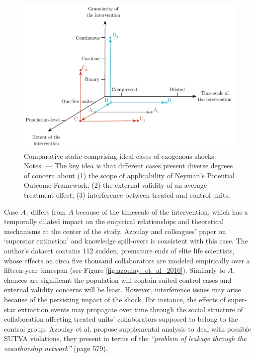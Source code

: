 \begin{refsection}
\begin{figure}[!htbp]
    \begin{center}
      \includegraphics[width=1\textwidth]{exhibits/comparative_static.pdf}
    \end{center}
    \caption{Comparative static comprising ideal cases of exogenous shocks. 
    Notes. --- The key idea is that different cases present diverse 
    degrees of concern about (1) the scope of applicability of Neyman's
    Potential Outcome Framework; (2) the external validity of an average
    treatment effect; (3) interference between treated and control
    units.}
    \label{fig:comparative_static}
\end{figure}

Case $A_{1}$ differs from $A$ because of the timescale of the intervention,
which has a temporally dilated impact on the empirical relationships and 
theoretical mechanisms at the center of the study. Azoulay and colleagues'
\autocite*{azoulay_et_al_2010} paper on `superstar extinction' and knowledge
spill-overs is consistent with this case. The author's dataset contains 112
sudden, premature ends of elite life scientists, whose effects on circa five
thousand collaborators are modeled empirically over a fifteen-year timespan
(see Figure \ref{fig:azoulay_et_al_2010}). Similarly to $A$, chances are
significant the population will contain suited control cases and external
validity concerns will be least. However, interference issues may arise because
of the persisting impact of the shock.  For instance, the effects of super-star
extinction events may propagate over time through the social structure of
collaboration affecting treated units' collaborators supposed
to belong to the control group. Azoulay et al.  \autocite*{azoulay_et_al_2010}
propose supplemental analysis to deal with possible SUTVA violations, they
present in terms of the \textit{``problem of leakage through the coauthorship
network''} (page 579).


\end{refsection}
